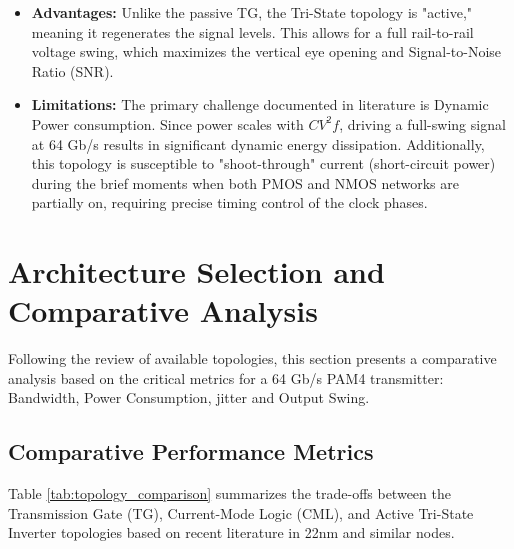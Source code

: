 \documentclass[12pt, a4paper]{report}
\begin{document}
\begin{itemize}
    \item \textbf{Advantages:} Unlike the passive TG, the Tri-State topology is "active," meaning it regenerates the signal levels. This allows for a full rail-to-rail voltage swing, which maximizes the vertical eye opening and Signal-to-Noise Ratio (SNR).
    \item \textbf{Limitations:} The primary challenge documented in literature is Dynamic Power consumption. Since power scales with $CV^2f$, driving a full-swing signal at 64 Gb/s results in significant dynamic energy dissipation. Additionally, this topology is susceptible to "shoot-through" current (short-circuit power) during the brief moments when both PMOS and NMOS networks are partially on, requiring precise timing control of the clock phases.
\end{itemize}

\section{Architecture Selection and Comparative Analysis}
\label{sec:arch_selection}

Following the review of available topologies, this section presents a comparative analysis based on the critical metrics for a 64 Gb/s PAM4 transmitter: Bandwidth, Power Consumption, jitter and Output Swing.

\subsection{Comparative Performance Metrics}
Table \ref{tab:topology_comparison} summarizes the trade-offs between the Transmission Gate (TG), Current-Mode Logic (CML), and Active Tri-State Inverter topologies based on recent literature in 22nm and similar nodes.
\end{document}
